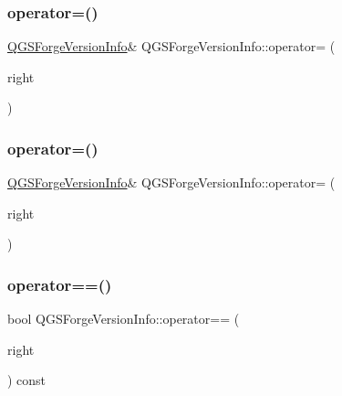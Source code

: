 \subsubsection{\texorpdfstring{operator=()}{operator=()}\hspace{0.1cm}{\footnotesize\ttfamily [1/2]}}
{\footnotesize\ttfamily \mbox{\hyperlink{class_q_g_s_forge_version_info}{Q\+G\+S\+Forge\+Version\+Info}}\& Q\+G\+S\+Forge\+Version\+Info\+::operator= (\begin{DoxyParamCaption}\item[{const \mbox{\hyperlink{class_q_g_s_forge_version_info}{Q\+G\+S\+Forge\+Version\+Info}} \&}]{right }\end{DoxyParamCaption})\hspace{0.3cm}{\ttfamily [default]}}

\mbox{\label{class_q_g_s_forge_version_info_a224ff90028ab648150737f4d0b677e04}} 
\subsubsection{\texorpdfstring{operator=()}{operator=()}\hspace{0.1cm}{\footnotesize\ttfamily [2/2]}}
{\footnotesize\ttfamily \mbox{\hyperlink{class_q_g_s_forge_version_info}{Q\+G\+S\+Forge\+Version\+Info}}\& Q\+G\+S\+Forge\+Version\+Info\+::operator= (\begin{DoxyParamCaption}\item[{\mbox{\hyperlink{class_q_g_s_forge_version_info}{Q\+G\+S\+Forge\+Version\+Info}} \&\&}]{right }\end{DoxyParamCaption})\hspace{0.3cm}{\ttfamily [default]}}

\mbox{\label{class_q_g_s_forge_version_info_a525507c6ac16d6e9fcc001cf2e521874}} 
\subsubsection{\texorpdfstring{operator==()}{operator==()}}
{\footnotesize\ttfamily bool Q\+G\+S\+Forge\+Version\+Info\+::operator== (\begin{DoxyParamCaption}\item[{const \mbox{\hyperlink{class_q_g_s_forge_version_info}{Q\+G\+S\+Forge\+Version\+Info}} \&}]{right }\end{DoxyParamCaption}) const}

